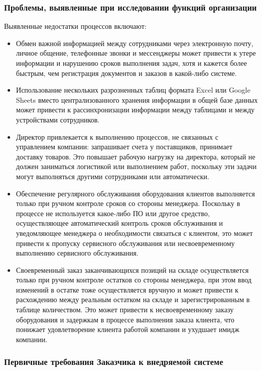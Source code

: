 \documentclass[a4paper,12pt]{article}
\begin{document}
\subsubsection{Проблемы, выявленные при исследовании функций организации}

Выявленные недостатки процессов включают:
\begin{itemize}
    \item Обмен важной информацией между сотрудниками через электронную почту, личное общение, телефонные звонки и мессенджеры может привести к утере информации и нарушению сроков выполнения задач, хотя и кажется более быстрым, чем регистрация документов и заказов в какой-либо системе.
    \item Использование нескольких разрозненных таблиц формата Excel или Google Sheets вместо централизованного хранения информации в общей базе данных может привести к рассинхронизации информации между таблицами и между устройствами сотрудников.
    \item Директор привлекается к выполнению процессов, не связанных с управлением компании: запрашивает счета у поставщиков, принимает доставку товаров. Это повышает рабочую нагрузку на директора, который не должен заниматься логистикой или выполнением работ, поскольку эти задачи могут выполняться другими сотрудниками или автоматически.
    \item Обеспечение регулярного обслуживания оборудования клиентов выполняется только при ручном контроле сроков со стороны менеджера. Поскольку в процессе не используется какое-либо ПО или другое средство, осуществляющее автоматический контроль сроков обслуживания и уведомляющее менеджера о необходимости связаться с клиентом, это может привести к пропуску сервисного обслуживания или несвоевременному выполнению сервисного обслуживания.
    \item Своевременный заказ заканчивающихся позиций на складе осуществляется только при ручном контроле остатков со стороны менеджера, при этом ввод изменений в остатке тоже осуществляется вручную и может привести к расхождению между реальным остатком на складе и зарегистрированным в таблице количеством. Это может привести к несвоевременному заказу оборудования и задержкам в процессе выполнения заказа клиента, что понижает удовлетворение клиента работой компании и ухудшает имидж компании.
\end{itemize}

\subsubsection{Первичные требования Заказчика к внедряемой системе}
\end{document}
